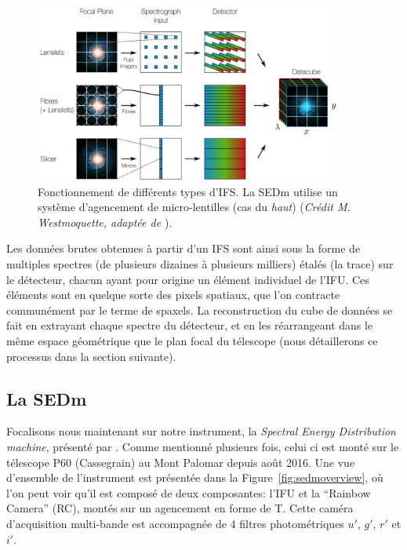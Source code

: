 \documentclass[../main/main.tex]{subfiles}
\begin{document}
\begin{figure}[ht]
  \centering
  \includegraphics[width=0.9\textwidth]{../figures/03_sedm/ifsgeneral.png}
  \caption[Fonctionnement de différents types d'IFS]{Fonctionnement de
    différents types d'IFS. La SEDm utilise un système d'agencement de micro-lentilles (cas
    du \textit{haut})
    (\textit{Crédit M. Westmoquette, adaptée de \citet{allingtonIFS}}).}
  \label{fig:ifsgeneral}
\end{figure}

Les données brutes obtenues à partir d'un IFS sont ainsi sous la forme
de multiples spectres (de plusieurs dizaines à plusieurs milliers)
étalés (la trace) sur le détecteur, chacun ayant pour origine un élément individuel
de l'IFU. Ces éléments sont en quelque sorte des pixels spatiaux, que
l'on contracte communément par le terme de spaxels. La reconstruction du
cube de données se fait en extrayant chaque spectre du détecteur, et en
les réarrangeant dans le même espace géométrique que le plan focal du
télescope (nous détaillerons ce processus dans la section suivante).

\subsection{La SEDm}\label{ssec:sedm}

Focalisons nous maintenant sur notre instrument, la \textit{Spectral Energy
Distribution machine}, présenté par \citet{SEDM18}. Comme mentionné plusieurs fois, celui ci est monté
sur le télescope P60 (Cassegrain) au Mont Palomar depuis août 2016. Une vue
d'ensemble de l'instrument est présentée dans la
Figure~\ref{fig:sedmoverview}, où l'on peut voir qu'il est composé de
deux composantes: l'IFU et la ``Rainbow Camera'' (RC), montés sur un
agencement en forme de T. Cette caméra d'acquisition multi-bande est
accompagnée de 4 filtres photométriques $u'$, $g'$, $r'$ et $i'$.
\end{document}
